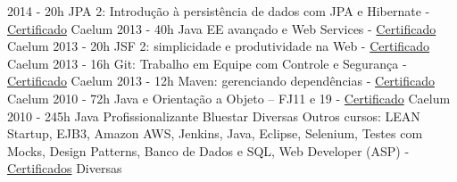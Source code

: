 \begin{entrylistii}
  \entryii
    {2014 - 20h}
    {JPA 2: Introdução à persistência de dados com JPA e Hibernate - \href{https://www.alura.com.br/user/3311/fullCertificate/bdd8817990ef209f0fb6b049f2d2ea0c}{Certificado}}
    {Caelum}
  \entryii
    {2013 - 40h}
    {Java EE avançado e Web Services - \href{https://www.alura.com.br/user/3311/fullCertificate/bdd8817990ef209f0fb6b049f2d2ea0c}{Certificado}}
    {Caelum}
  \entryii
    {2013 - 20h}
    {JSF 2: simplicidade e produtividade na Web - \href{https://www.alura.com.br/user/3311/fullCertificate/bdd8817990ef209f0fb6b049f2d2ea0c}{Certificado}}
    {Caelum}
  \entryii
    {2013 - 16h}
    {Git: Trabalho em Equipe com Controle e Segurança - \href{https://www.alura.com.br/user/3311/fullCertificate/bdd8817990ef209f0fb6b049f2d2ea0c}{Certificado}}
    {Caelum}
  \entryii
    {2013 - 12h}
    {Maven: gerenciando dependências - \href{https://www.alura.com.br/user/3311/fullCertificate/bdd8817990ef209f0fb6b049f2d2ea0c}{Certificado}}
    {Caelum}
  \entryii
    {2010 - 72h}
    {Java e Orientação a Objeto – FJ11 e 19 - \href{https://www.alura.com.br/user/3311/fullCertificate/bdd8817990ef209f0fb6b049f2d2ea0c}{Certificado}}
    {Caelum}
  \entryii
    {2010 - 245h}
    {Java Profissionalizante}
    {Bluestar}
  \entryii
    {Diversas}
    {Outros cursos: LEAN Startup, EJB3, Amazon AWS, Jenkins, Java, Eclipse, Selenium, Testes com Mocks, Design Patterns, Banco de Dados e SQL, Web Developer (ASP) - \href{https://www.alura.com.br/user/3311/fullCertificate/bdd8817990ef209f0fb6b049f2d2ea0c}{Certificados}}
    {Diversas}
\end{entrylistii}

